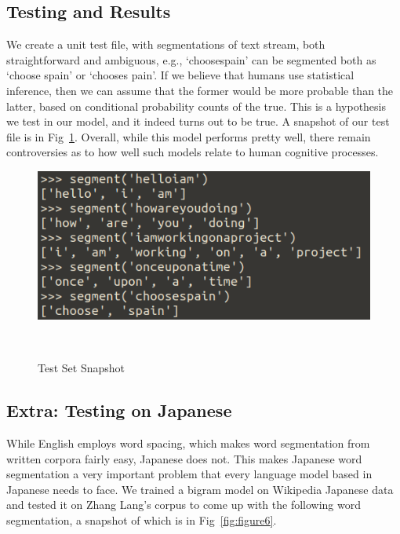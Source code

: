\documentclass{article}
\begin{document}
\subsection{Testing and Results}
\vspace{-1mm}
We create a unit test file, with segmentations of text stream, both straightforward and ambiguous, e.g., `choosespain' can be segmented both as `choose spain' or `chooses pain'. If we believe that humans use statistical inference, then we can assume that the former would be more probable than the latter, based on conditional probability counts of the true. This is a hypothesis we test in our model, and it indeed turns out to be true. A snapshot of our test file is in Fig~\ref{fig:figure5}. Overall, while this model performs pretty well, there remain controversies as to how well such models relate to human cognitive processes.
\vspace{-1mm}
\begin{figure}[h!]
  \centering
  \includegraphics[scale=0.8]{figures/ngram_test_set.png}
  \caption{Test Set Snapshot}~\label{fig:figure5}
\end{figure}

\subsection{Extra: Testing on Japanese}
\vspace{-1mm}
While English employs word spacing, which makes word segmentation from written corpora fairly easy, Japanese does not. This makes Japanese word segmentation a very important problem that every language model based in Japanese needs to face. We trained a bigram model on Wikipedia Japanese data and tested it on Zhang Lang's corpus to come up with the following word segmentation, a snapshot of which is in Fig~\ref{fig:figure6}.
\end{document}
